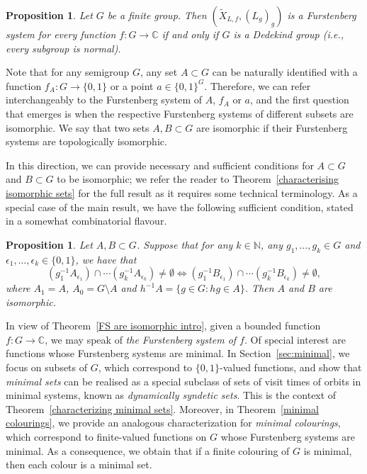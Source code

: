 \documentclass{amsart}
\numberwithin{equation}{section}
\newtheorem{proposition}[lemma]{Proposition}
\theoremstyle{definition}
\theoremstyle{plain}
\newcommand{\C}{{\mathbb C}}
\newcommand{\N}{{\mathbb N}}
\begin{document}
\begin{proposition}
Let $G$ be a finite group. Then $(\widetilde{X}_{L,f}, (L_g)_g)$ is a 
Furstenberg system for every function $f: G \to \mathbb{C}$ if and only 
if $G$ is a Dedekind group (i.e., every subgroup is normal).
\end{proposition}


Note that for any semigroup $G$, any set $A \subset G$ can 
be naturally identified with a function $f_A: G \to \{0,1\}$ or a point $a\in \{0,1\}^G$.  
Therefore, we can refer interchangeably to the Furstenberg 
system of $A$, $f_A$ or $a$, and the first question that 
emerges is when the respective Furstenberg systems of 
different subsets are isomorphic. We say 
that two sets $A, B \subset G$ are isomorphic if their 
Furstenberg systems are topologically isomorphic.  

In this direction, we can provide necessary and 
sufficient conditions for $A\subset G$ and $B\subset G$ 
to be isomorphic; we refer the reader to 
Theorem~\ref{characterising isomorphic sets} for the full 
result as it requires some technical 
terminology. As a special case of the main result, we 
have the following sufficient condition, stated in a 
somewhat combinatorial flavour.

\begin{proposition}\label{isomorphic sets intro}
Let $A,B\subset G$. Suppose that for any $k\in \N$,
any $g_1,\ldots,g_k\in G$ and $\epsilon_1,\ldots,\epsilon_k\in \{0,1\}$, we have that
$$(g_1^{-1}A_{\epsilon_1})\cap \cdots (g_k^{-1}A_{\epsilon_k})\neq \emptyset \iff (g_1^{-1}B_{\epsilon_1})\cap \cdots (g_k^{-1}B_{\epsilon_k})\neq \emptyset,$$
where $A_{1}=A$, $A_{0}=G\setminus A$ and $h^{-1}A=\{g\in G: hg\in A\}$. Then $A$ and $B$ are isomorphic.
\end{proposition}


In view of Theorem~\ref{FS are isomorphic intro}, given a bounded function 
$f: G \to \C$, we may speak of \emph{the Furstenberg system of $f$}.  
Of special interest are functions whose Furstenberg systems are minimal. In Section~\ref{sec:minimal}, we focus on subsets of $G$, which correspond to $\{0,1\}$-valued functions, and show that \emph{minimal sets} can be realised as a special subclass of sets of visit times of orbits in minimal systems, known as \emph{dynamically syndetic sets}. This is the context of Theorem~\ref{characterizing minimal sets}.  
Moreover, in Theorem~\ref{minimal colourings}, we provide an analogous characterization for \emph{minimal colourings}, which correspond to finite-valued functions on $G$ whose Furstenberg systems are minimal. As a consequence, we obtain that if a finite colouring of $G$ is minimal, then each colour is a minimal set.
\end{document}
